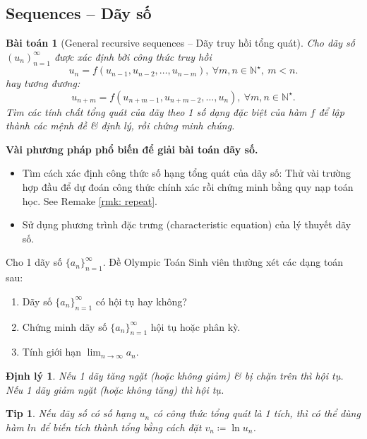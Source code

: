 \documentclass{article}
\newtheorem{baitoan}{Bài toán}
\newtheorem{dinhly}{Định lý}
\newtheorem{tip}{Tip}
\begin{document}
\subsection{Sequences -- Dãy số}
\begin{baitoan}[General recursive sequences -- Dãy truy hồi tổng quát]
	Cho dãy số $(u_n)_{n=1}^\infty$ được xác định bởi công thức truy hồi
	\begin{equation}
		\boxed{u_n = f(u_{n-1},u_{n-2},\ldots,u_{n-m}),\ \forall m,n\in\mathbb{N}^\star,\ m < n.}
	\end{equation}
	hay tương đương:
	\begin{equation*}
		\boxed{u_{n + m} = f(u_{n + m - 1},u_{n+m-2},\ldots,u_n),\ \forall m,n\in\mathbb{N}^\star.}
	\end{equation*}
	Tìm các tính chất tổng quát của dãy theo 1 số dạng đặc biệt của hàm $f$ để lập thành các mệnh đề \& định lý, rồi chứng minh chúng.
\end{baitoan}
\textbf{\textsf{Vài phương pháp phổ biến để giải bài toán dãy số.}}
\begin{itemize}
	\item Tìm cách xác định công thức số hạng tổng quát của dãy số: Thử vài trường hợp đầu để dự đoán công thức chính xác rồi chứng minh bằng quy nạp toán học. See Remake \ref{rmk: repeat}.
	\item Sử dụng phương trình đặc trưng (characteristic equation) của lý thuyết dãy số.
\end{itemize}
Cho 1 dãy số $\{a_n\}_{n=1}^\infty$. Đề Olympic Toán Sinh viên thường xét các dạng toán sau:
\begin{enumerate}
	\item Dãy số $\{a_n\}_{n=1}^\infty$ có hội tụ hay không?
	\item Chứng minh dãy số $\{a_n\}_{n=1}^\infty$ hội tụ hoặc phân kỳ.
	\item Tính giới hạn $\lim_{n\to\infty} a_n$.
\end{enumerate}

\begin{dinhly}
	Nếu 1 dãy tăng ngặt (hoặc không giảm) \& bị chặn trên thì hội tụ. Nếu 1 dãy giảm ngặt (hoặc không tăng) thì hội tụ.
\end{dinhly}

\begin{tip}
	Nếu dãy số có số hạng $u_n$ có công thức tổng quát là 1 tích, thì có thể dùng hàm $ln$ để biến tích thành tổng bằng cách đặt $v_n\coloneqq\ln u_n$.
\end{tip}
\end{document}
